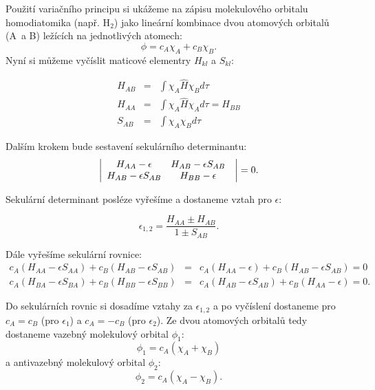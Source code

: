  \begin{priklad}
 Použití variačního principu si ukážeme na zápisu molekulového orbitalu homodiatomika (např. H$_{2}$) jako lineární kombinace dvou atomových orbitalů (A~a B) ležících na jednotlivých atomech:  
  \begin{displaymath} 
\phi = c_A\chi_A+c_B\chi_B.    
\end{displaymath}
Nyní si můžeme vyčíslit maticové elementry $H_{kl}$ a $S_{kl}$:

\begin{eqnarray}
H_{AB}&=&\int \chi_A\hat{H}\chi_Bd\tau\nonumber\\
H_{AA}&=&\int \chi_A\hat{H}\chi_Ad\tau=H_{BB}\nonumber\\
S_{AB}&=&\int \chi_A \chi_B d\nonumber\tau
\end{eqnarray}   

Dalším krokem bude sestavení sekulárního determinantu:
 \begin{displaymath}
    \left|\begin{array}{cc@{\quad}r}
     H_{AA} -\epsilon & H_{AB}-\epsilon S_{AB}  \\
     H_{AB} -\epsilon S_{AB} & H_{BB}-\epsilon  \\
    \end{array}\right |=0.
    \end{displaymath}

Sekulární determinant posléze vyřešíme a dostaneme vztah pro $\epsilon$:

\begin{displaymath}
\epsilon_{1,2}=\frac{H_{AA}\pm H_{AB}}{1\pm S_{AB}}.
\end{displaymath}

Dále vyřešíme sekulární rovnice:
\begin{eqnarray}
c_A(H_{AA}-\epsilon S_{AA})+c_B(H_{AB}-\epsilon S_{AB})&=&
c_A(H_{AA}-\epsilon)+c_B(H_{AB}-\epsilon S_{AB})=0\nonumber\\
c_A(H_{BA}-\epsilon S_{BA})+c_B(H_{BB}-\epsilon S_{BB})&=&
c_A(H_{AB}-\epsilon S_{AB})+c_B(H_{AA}-\epsilon)=0.\nonumber
\end{eqnarray}

Do sekulárních rovnic si dosadíme vztahy za $ \epsilon_{1,2} $
a po vyčíslení dostaneme pro  $c_A=c_B$ (pro $ \epsilon_1 $) a $c_A=-c_B$ (pro $ \epsilon_2 $). Ze dvou atomových orbitalů tedy dostaneme vazebný molekulový orbital $ \phi_1 $:
\begin{displaymath}
\phi_1=c_A(\chi_A+\chi_B)
\end{displaymath}
a antivazebný molekulový orbital $ \phi_2 $:
\begin{displaymath}
\phi_2=c_A(\chi_A-\chi_B).
\end{displaymath}
\end{priklad}
 
